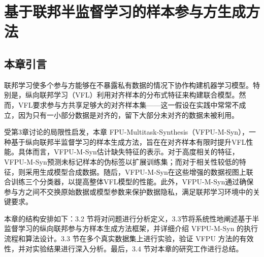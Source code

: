 \chapter{基于联邦半监督学习的样本参与方生成方法}
\thispagestyle{others}
\pagestyle{others}
\xiaosi

\section{本章引言}
联邦学习使多个参与方能够在不暴露私有数据的情况下协作构建机器学习模型。特别是，纵向联邦学习（VFL）利用对齐样本的分布式特征来构建联合模型。然而，VFL要求参与方共享足够大的对齐样本集——这一假设在实践中常常不成立，因为只有一小部分数据是对齐的，留下大部分未对齐的数据未被利用。

受第3章讨论的局限性启发，本章
FPU-Multitask-Synthesis（VFPU-M-Syn），一种基于纵向联邦半监督学习的样本生成方法，旨在在对齐样本有限时提升VFL性能。具体而言，VFPU-M-Syn估计缺失特征的表示。对于高度相关的特征，VFPU-M-Syn预测未标记样本的伪标签以扩展训练集；而对于相关性较低的特征，则采用生成模型合成数据。随后，VFPU-M-Syn在这些增强的数据视图上联合训练三个分类器，以提高整体VFL模型的性能。此外，VFPU-M-Syn通过确保参与方之间不交换原始数据或模型参数来保护数据隐私，满足联邦学习环境中的关键要求。

本章的结构安排如下：3.2 节将对问题进行分析定义，3.3节将系统性地阐述基于半监督学习的纵向联邦参与方样本生成方法框架，并详细介绍 VFPU-M-Syn 的执行流程和算法设计。3.3 节在多个真实数据集上进行实验，验证 VFPU 方法的有效性，并对实验结果进行深入分析。最后，3.4 节对本章的研究工作进行总结。

